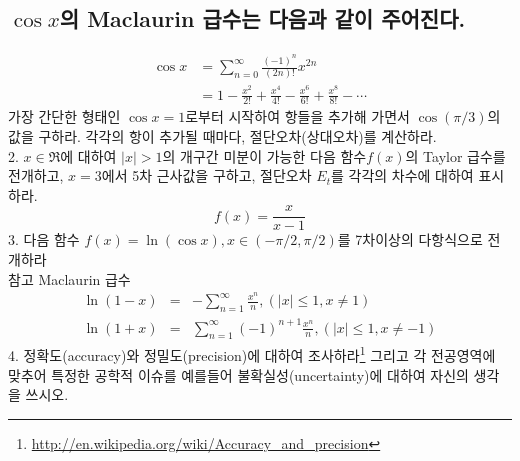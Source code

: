 \documentclass{article}
\numberwithin{equation}{section}
\theoremstyle{examplestyle}
\begin{document}
\subsection{$\cos x$의 Maclaurin 급수는 다음과 같이 주어진다.}
\begin{equation}
\begin{split}
\cos x&=\sum_{n=0}^{\infty}\frac{(-1)^n}{(2n)!}x^{2n}\\
&=1-\frac{x^2}{2!}+\frac{x^4}{4!}-\frac{x^6}{6!}+\frac{x^8}{8!}-\cdots
\end{split}
\end{equation}
가장 간단한 형태인 $\cos x =1$로부터 시작하여 항들을 추가해 가면서 $\cos(\pi/3)$의 값을 구하라. 각각의 항이 추가될 때마다, 절단오차(상대오차)를 계산하라.\\


2. $x\in \Re$에 대하여 $|x|>1$의 개구간 미분이 가능한 다음 함수$f(x)$의 Taylor 급수를 전개하고, $x=3$에서 5차 근사값을 구하고, 절단오차 $E_{t}$를 각각의 차수에 대하여 표시하라.
\begin{displaymath}
f(x)=\frac{x}{x-1}
\end{displaymath}
3. 다음 함수 $f(x)=\ln(\cos x), x\in (-\pi/2,\pi/2)$를 7차이상의 다항식으로 전개하라\\

참고 Maclaurin 급수
\begin{eqnarray*}
\ln(1-x)&=&-\sum_{n=1}^{\infty}\frac{x^n}{n}, (|x|\leq 1, x\neq 1)\\
\ln(1+x)&=&\sum_{n=1}^{\infty}(-1)^{n+1}\frac{x^n}{n}, (|x|\leq 1, x\neq -1)
\end{eqnarray*}
4. 정확도(accuracy)와 정밀도(precision)에 대하여 조사하라\footnote{\url{http://en.wikipedia.org/wiki/Accuracy_and_precision}} 그리고 각 전공영역에 맞추어  특정한 공학적 이슈를 예를들어 불확실성(uncertainty)에 대하여 자신의 생각을 쓰시오.
\end{document}
